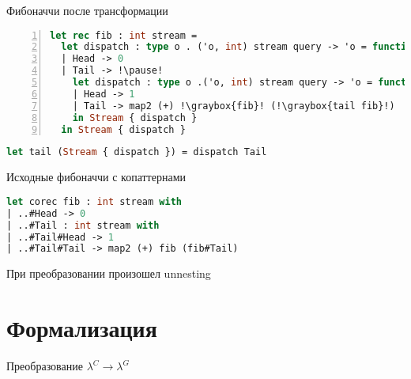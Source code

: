 \documentclass[10pt, mathserif]{beamer}
\newcommand{\graybox}[1]{\colorbox{light-gray}{#1}}
\theoremstyle{definition}
\begin{document}
\begin{frame}[fragile]{Фибоначчи после трансформации}
\begin{lstlisting}[language=ocaml,numbers=left,stepnumber=1]
let rec fib : int stream =
  let dispatch : type o . ('o, int) stream query -> 'o = function
  | Head -> 0
  | Tail -> !\pause!
    let dispatch : type o .('o, int) stream query -> 'o = function
    | Head -> 1
    | Tail -> map2 (+) !\graybox{fib}! (!\graybox{tail fib}!)
    in Stream { dispatch }
  in Stream { dispatch }
\end{lstlisting}
\begin{lstlisting}[language=ocaml]
let tail (Stream { dispatch }) = dispatch Tail
\end{lstlisting}


\end{frame}

\begin{frame}[fragile]{Исходные фибоначчи с копаттернами}
\begin{lstlisting}[language=ocaml]
let corec fib : int stream with
| ..#Head -> 0
| ..#Tail : int stream with
| ..#Tail#Head -> 1
| ..#Tail#Tail -> map2 (+) fib (fib#Tail)
\end{lstlisting}

При преобразовании произошел unnesting
\end{frame}


\section{Формализация}

\begin{frame}[c]{Преобразование}
\centering
{\LARGE $\lambda^C \to \lambda^G$}
\end{frame}
\end{document}

